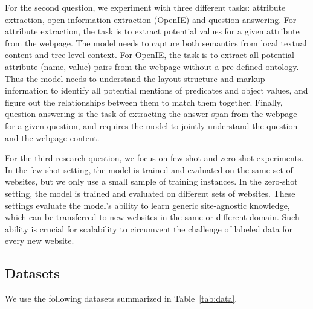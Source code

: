 \documentclass[sigconf, nonacm]{acmart}
\begin{document}
For the second question, we experiment with three different tasks: attribute extraction, open information extraction (OpenIE) and question answering. For attribute extraction, the task is to extract potential values for a given attribute from the webpage. The model needs to capture both semantics from local textual content and tree-level context. For OpenIE, the task is to extract all potential attribute (name, value) pairs from the webpage without a pre-defined ontology. Thus the model needs to understand the layout structure and markup information to identify all potential mentions of predicates and object values, and figure out the relationships between them to match them together. Finally, question answering is the task of extracting the answer span from the webpage for a given question, and requires the model to jointly understand the question and the webpage content. 

For the third research question, we focus on few-shot and zero-shot experiments. In the few-shot setting, the model is trained and evaluated on the same set of websites, but we only use a small sample of training instances. In the zero-shot setting, the model is trained and evaluated on different sets of websites. These settings evaluate the model's ability to learn generic site-agnostic knowledge, which can be transferred to new websites in the same or different domain. Such ability is crucial for scalability to circumvent the challenge of labeled data for every new website.

\subsection{Datasets}
We use the following datasets summarized in Table~\ref{tab:data}.
\vspace{0.5em}
\begin{table}[]
    \centering
    \caption{Data statistics. \# Nodes is the average number of DOM nodes in the HTML documents after cleaning noisy HTML tags. For Movie-Music, we also show the number of clusters in parenthesis, which is the actual number of unique webpage templates.}\vspace{-10pt}
    \vspace{-15pt}
    \label{tab:data}
\end{table}
\end{document}
